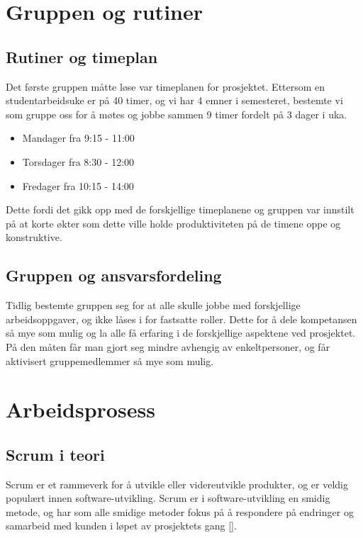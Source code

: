 \documentclass[12pt,a4paper,norsk]{article}
\begin{document}
	\section{Gruppen og rutiner}
	
\subsection{Rutiner og timeplan}

Det første gruppen måtte løse var timeplanen for prosjektet. Ettersom en studentarbeidsuke er på 40 timer, og vi har 4 emner i semesteret, bestemte vi som gruppe oss for å møtes og jobbe sammen 9 timer fordelt på 3 dager i uka.

\begin{itemize}
  \item[] Mandager fra 9:15 - 11:00 
  \item[] Torsdager fra 8:30 - 12:00
  \item[] Fredager fra 10:15 - 14:00
\end{itemize}

Dette fordi det gikk opp med de forskjellige timeplanene og gruppen var innstilt på at korte økter som dette ville holde produktiviteten på de timene oppe og konstruktive. 


\subsection{Gruppen og ansvarsfordeling}
Tidlig bestemte gruppen seg for at alle skulle jobbe med forskjellige arbeidsoppgaver, og ikke låses i for fastsatte roller. Dette for å dele kompetansen så mye som mulig og la alle få erfaring i de forskjellige aspektene ved prosjektet. På den måten får man gjort seg mindre avhengig av enkeltpersoner, og får aktivisert gruppemedlemmer så mye som mulig. 

	\section{Arbeidsprosess}
	\subsection{Scrum i teori}
	Scrum er et rammeverk for å utvikle eller videreutvikle produkter, og er veldig populært innen software-utvikling. Scrum er i software-utvikling en smidig metode, og har som alle smidige metoder fokus på å respondere på endringer og samarbeid med kunden i løpet av prosjektets gang [\cite{agilemanifesto}].
	
\end{document}
